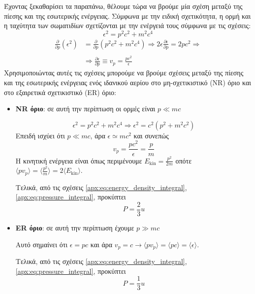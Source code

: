 Έχοντας ξεκαθαρίσει τα παραπάνω, θέλουμε τώρα να βρούμε μία σχέση μεταξύ της πίεσης και της εσωτερικής ενέργειας. Σύμφωνα με την ειδική σχετικότητα, η ορμή και η ταχύτητα των σωματιδίων σχετίζονται με την ενέργειά τους σύμφωνα με τις σχέσεις:
\begin{equation}
    \epsilon^2 = p^2 c^2 + m^2 c^4
\end{equation}
\begin{align}
    \nonumber \frac{\partial}{\partial p} (\epsilon^2) &= \frac{\partial}{\partial p} (p^2 c^2 + m^2 c^4) \Rightarrow 2\epsilon \frac{\partial \epsilon}{\partial p} = 2p c^2 \Rightarrow \\\nonumber\\
    &\Rightarrow \frac{\partial \epsilon}{\partial p} \equiv v_p = \frac{pc^2}{\epsilon}
\end{align}
Χρησιμοποιώντας αυτές τις σχέσεις μπορούμε να βρούμε σχέσεις μεταξύ της πίεσης και της εσωτερικής ενέργειας ενός ιδανικού αερίου στο μη-σχετικιστικό (NR) όριο και στο εξαιρετικά σχετικιστικό (ER) όριο:

\begin{itemize}
    \item \textbf{NR όριο}: σε αυτή την περίπτωση οι ορμές είναι $p \ll mc$
    
    $$\epsilon^2 = p^2 c^2 + m^2 c^4 \Rightarrow \epsilon^2 = c^2 \left(p^2 + m^2c^2 \right)$$
    Επειδή ισχύει ότι $p \ll mc$, άρα $\epsilon \simeq mc^2$ και συνεπώς
    $$v_p = \frac{pc^2}{\epsilon} = \frac{p}{m}$$
    Η κινητική ενέργεια είναι όπως περιμένουμε $E_{\text{kin}} = \frac{p^2}{2m}$ οπότε $\langle p v_p \rangle = \langle \frac{p^2}{m} \rangle = 2 \langle E_{\text{kin}} \rangle $.
    
    Τελικά, από τις σχέσεις \eqref{apx:eq:energy_density_integral}, \eqref{apx:eq:pressure_integral}, προκύπτει
    \begin{equation}
        \label{apx:eq:pressure_internal_energy_relation_for_nr_case}
        \boxed{P = \frac{2}{3}u}
    \end{equation}
    
    \item \textbf{ER όριο}: σε αυτή την περίπτωση έχουμε $p \gg mc$
    
    Αυτό σημαίνει ότι $\epsilon = pc$ και άρα $v_p = c \longrightarrow \langle p v_p \rangle = \langle pc \rangle = \langle \epsilon \rangle$.
    
    Τελικά, από τις σχέσεις \eqref{apx:eq:energy_density_integral}, \eqref{apx:eq:pressure_integral}, προκύπτει
    \begin{equation}
        \label{apx:eq:pressure_internal_energy_relation_for_er_case}
        \boxed{P = \frac{1}{3}u}
    \end{equation}
\end{itemize}

